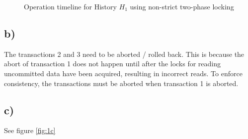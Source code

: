 \documentclass{scrartcl}
\begin{document}
\begin{figure}[ht!]
\caption{Operation timeline for History \(H_1\) using non-strict two-phase locking}
\end{figure}

\subsection*{b)}

The transactions 2 and 3 need to be aborted / rolled back.
This is because the abort of transaction 1 does not happen until after the locks for reading uncommitted data have been acquired, resulting in incorrect reads.
To enforce consistency, the transactions must be aborted when transaction 1 is aborted.

\subsection*{c)}

See figure \ref{fig:1c}
\end{document}
